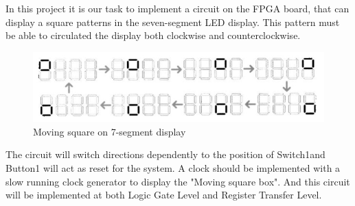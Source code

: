 In this project it is our task to implement a circuit on the FPGA board, that can display a square patterns in the seven-segment LED display. This pattern must be able to  circulated the display both clockwise and counterclockwise.

\begin{figure}[!htbp] 
	\centering 
		\includegraphics[scale=0.4]{fig/DigitBox.jpg} 
	\caption{Moving square on 7-segment display}
	\label{fig:1} 
\end{figure}

The circuit will switch directions dependently to the position of Switch1and Button1 will act as reset for the system. A clock should be implemented with a slow running clock generator to display the "Moving square box". And this circuit will be implemented at both Logic Gate Level and Register Transfer Level.   
